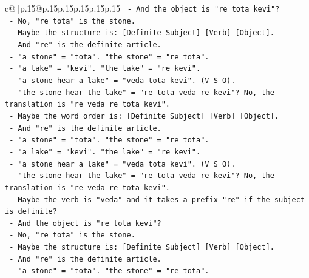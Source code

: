 \documentclass{article}
\begin{document}
{\begin{supertabular}{c@{$\;$}|p{.15\linewidth}@{}p{.15\linewidth}p{.15\linewidth}p{.15\linewidth}p{.15\linewidth}p{.15\linewidth}}
{{{\texttt{                           {-} And the object is "re tota kevi"?} \\
\texttt{                           {-} No, "re tota" is the stone.} \\
\texttt{                           {-} Maybe the structure is: {[}Definite Subject{]} {[}Verb{]} {[}Object{]}.} \\
\texttt{                           {-} And "re" is the definite article.} \\
\texttt{                           {-} "a stone" = "tota". "the stone" = "re tota".} \\
\texttt{                           {-} "a lake" = "kevi". "the lake" = "re kevi".} \\
\texttt{                           {-} "a stone hear a lake" = "veda tota kevi". (V S O).} \\
\texttt{                           {-} "the stone hear the lake" = "re tota veda re kevi"? No, the translation is "re veda re tota kevi".} \\
\texttt{                           {-} Maybe the word order is: {[}Definite Subject{]} {[}Verb{]} {[}Object{]}.} \\
\texttt{                           {-} And "re" is the definite article.} \\
\texttt{                           {-} "a stone" = "tota". "the stone" = "re tota".} \\
\texttt{                           {-} "a lake" = "kevi". "the lake" = "re kevi".} \\
\texttt{                           {-} "a stone hear a lake" = "veda tota kevi". (V S O).} \\
\texttt{                           {-} "the stone hear the lake" = "re tota veda re kevi"? No, the translation is "re veda re tota kevi".} \\
\texttt{                           {-} Maybe the verb is "veda" and it takes a prefix "re" if the subject is definite?} \\
\texttt{                           {-} And the object is "re tota kevi"?} \\
\texttt{                           {-} No, "re tota" is the stone.} \\
\texttt{                           {-} Maybe the structure is: {[}Definite Subject{]} {[}Verb{]} {[}Object{]}.} \\
\texttt{                           {-} And "re" is the definite article.} \\
\texttt{                           {-} "a stone" = "tota". "the stone" = "re tota".} \\
}}}
\end{supertabular}}
\end{document}
